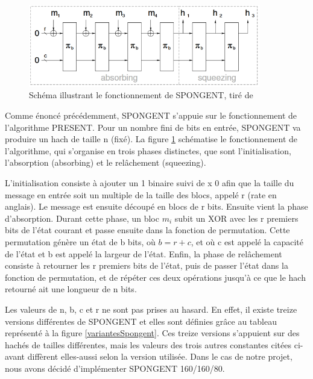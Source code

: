 		\begin{figure}[!h]
			 	\centering
			 	\includegraphics[width=0.9\textwidth]{imgs/Spongent/fctGlobalSpongent.png}
			 	\caption{Schéma illustrant le fonctionnement de SPONGENT, tiré de \cite{6275435}}
			 	\label{fctGlobalSpongent}
		\end{figure}

		Comme énoncé précédemment, SPONGENT s’appuie sur le fonctionnement de l’algorithme PRESENT.
		Pour un nombre fini de bits en entrée, SPONGENT va produire un hach de taille n (fixé).
		La figure \ref{fctGlobalSpongent} schématise le fonctionnement de l’algorithme, qui s’organise en trois phases distinctes, que sont l’initialisation, l’absorption (absorbing) et le relâchement (squeezing).

		L’initialisation consiste à ajouter un 1 binaire suivi de x 0 afin que la taille du message en entrée soit un multiple de la taille des blocs, appelé r (rate en anglais).
		Le message est ensuite découpé en blocs de r bits.
		Ensuite vient la phase d’absorption.
		Durant cette phase, un bloc $m_{i}$ subit un XOR avec les r premiers bits de l’état courant et passe ensuite dans la fonction de permutation.
		Cette permutation génère un état de b bits, où $b = r + c$, et où c est appelé la capacité de l’état et b est appelé la largeur de l’état.
		Enfin, la phase de relâchement consiste à retourner les r premiers bits de l’état, puis de passer l’état dans la fonction de permutation,
		et de répéter ces deux opérations jusqu’à ce que le hach retourné ait une longueur de n bits.

		Les valeurs de n, b, c et r ne sont pas prises au hasard. En effet, il existe treize versions différentes de SPONGENT et elles sont définies grâce au tableau représenté à la figure \ref{variantesSpongent}.
		Ces treize versions s’appuient sur des hachés de tailles différentes, mais les valeurs des trois autres constantes citées ci-avant diffèrent elles-aussi selon la version utilisée.
		Dans le cas de notre projet, nous avons décidé d’implémenter SPONGENT 160/160/80.

